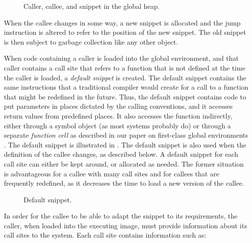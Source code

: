 \begin{figure}
\begin{center}
\end{center}
\caption{\label{fig-snippet}
Caller, callee, and snippet in the global heap.}
\end{figure}

When the callee changes in some way, a
new snippet is allocated and the jump instruction is altered to refer
to the position of the new snippet.  The old snippet is then subject
to garbage collection like any other object.

When code containing a caller is loaded into the global environment,
and that caller contains a call site that refers to a function that is
not defined at the time the caller is loaded, a \emph{default snippet}
is created.  The default snippet contains the same instructions that a
traditional compiler would create for a call to a function that might
be redefined in the future.  Thus, the default snippet contains code
to put parameters in places dictated by the calling conventions, and
it accesses return values from predefined places.  It also accesses
the function indirectly, either through a symbol object (as most
\commonlisp{} systems probably do) or through a separate
\emph{function cell} as described in our paper on first-class global
environments \cite{Strandh:2015:ELS:Environments}.  The default
snippet is illustrated in .  The default
snippet is also used when the definition of the callee changes, as
described below.  A default snippet for each call site can either be
kept around, or allocated as needed.  The former situation is
advantageous for a callee with many call sites and for callees that
are frequently redefined, as it decreases the time to load a new
version of the callee.

\begin{figure}
\begin{center}
\end{center}
\caption{\label{fig-default-snippet}
Default snippet.}
\end{figure}

In order for the callee to be able to adapt the snippet to its
requirements, the caller, when loaded into the executing image, must
provide information about its call sites to the system.  Each call
site contains information such as:

